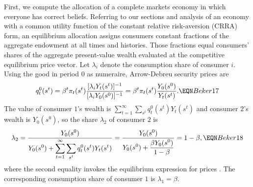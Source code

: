 First, we compute the allocation of a complete markets economy in which everyone has
correct beliefs. Referring to our sections
 and  analysis
of an economy with a common utility function of the constant relative
risk-aversion (CRRA) form, an equilibrium allocation assigns
 consumers  constant fractions of the aggregate endowment
at all times and histories.   Those fractions equal  consumers' shares of the aggregate
present-value wealth evaluated at the competitive equilibrium price
vector. Let $\lambda_i$ denote the consumption share of consumer $i$.
Using the good in period $0$ as  numeraire,  Arrow-Debreu
security prices are
$$
q^0_t(s^t) = \beta^t \pi_t(s^t) { [\lambda_i Y_t(s^t)]^{-1} \over
             [\lambda_i Y_0(s^0)]^{-1} }
           = \beta^t \pi_t(s^t) { Y_0(s^0) \over Y_t(s^t) }.  \EQN Beker17
$$
The value of consumer $1$'s wealth is
$\sum_{t=1}^\infty \sum_{s^t} q^0_t(s^t) Y_t(s^t)$ and consumer $2$'s
wealth is $Y_0(s^0)$, so the share $\lambda_2$ of consumer $2$ is
$$
\lambda_2 = { \displaystyle Y_0(s^0) \over \displaystyle
Y_0(s^0) + \sum_{t=1}^\infty \sum_{s^t} q^0_t(s^t) Y_t(s^t) }
          = {\displaystyle Y_0(s^0) \over \displaystyle
Y_0(s^0) + {\displaystyle \beta Y_0(s^0) \over \displaystyle 1-\beta }}
= 1-\beta,                                                    \EQN Beker18
$$
where the second equality invokes the equilibrium expression
for prices . The corresponding consumption share of
consumer $1$ is $\lambda_1= \beta$.


